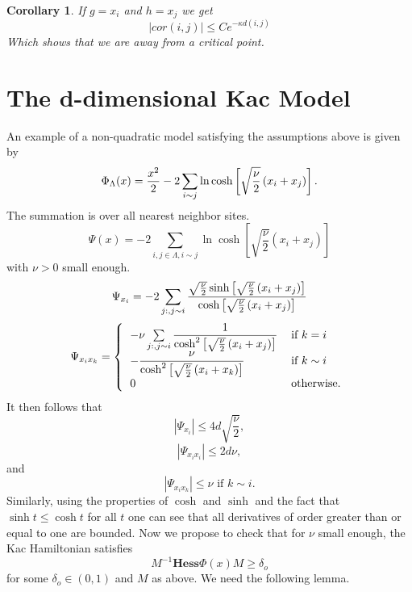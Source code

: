 \documentclass{article}
\newtheorem{corollary}[theorem]{Corollary}
\begin{document}
\begin{corollary}
If $g=x_{i}$ and $h=x_{j}$ we get 
\begin{equation*}
\left| cor(i,j)\right| \leq Ce^{-\kappa d(i,j)}
\end{equation*}%
Which shows that we are away from a critical point.
\end{corollary}

\section{The d-dimensional Kac Model}

An example of a non-quadratic model satisfying the assumptions above is
given by 
\begin{equation*}
\Phi _{\Lambda }(x)=\frac{x^{2}}{2}-2\sum_{i\sim j}\ln \cosh \left[ \sqrt{%
\frac{\nu }{2}}\left( x_{i}+x_{j}\right) \right] .
\end{equation*}%
The summation is over all nearest neighbor sites.%
\begin{equation*}
\Psi (x)=-2\sum_{i,j\in \Lambda ,i\sim j}\ln \cosh \left[ \sqrt{\frac{\nu }{2%
}}\left( x_{i}+x_{j}\right) \right]
\end{equation*}%
with $\nu >0$ small enough.%
\begin{equation*}
\Psi _{x_{i}}=-2\sum_{j:,j\sim i}\frac{\sqrt{\frac{\nu }{2}}\sinh \left[ 
\sqrt{\frac{\nu }{2}}\left( x_{i}+x_{j}\right) \right] }{\cosh \left[ \sqrt{%
\frac{\nu }{2}}\left( x_{i}+x_{j}\right) \right] }
\end{equation*}%
\begin{equation*}
\Psi _{x_{i}x_{k}}=\left\{ 
\begin{tabular}{ll}
$-\nu \sum\limits_{j:,j\sim i}\dfrac{1}{\cosh ^{2}\left[ \sqrt{\frac{\nu }{2}%
}\left( x_{i}+x_{j}\right) \right] }$ & if $k=i$ \\ 
$-\dfrac{\nu }{\cosh ^{2}\left[ \sqrt{\frac{\nu }{2}}\left(
x_{i}+x_{k}\right) \right] }$ & if $k\sim i$ \\ 
$0$ & otherwise.%
\end{tabular}%
\right.
\end{equation*}%
It then follows that%
\begin{equation*}
\left| \Psi _{x_{i}}\right| \leq 4d\sqrt{\frac{\nu }{2}},
\end{equation*}%
\begin{equation*}
\left| \Psi _{x_{i}x_{i}}\right| \leq 2d\nu ,
\end{equation*}%
and 
\begin{equation*}
\left| \Psi _{x_{i}x_{k}}\right| \leq \nu \text{ \ \ \ \ if }k\sim i.
\end{equation*}%
Similarly, using the properties of $\cosh $ and $\sinh $ and the fact that $%
\sinh t\leq \cosh t$ for all $t$ one can see that all derivatives of order
greater than or equal to one are bounded. Now we propose to check that for $%
\nu $ small enough, the Kac Hamiltonian satisfies 
\begin{equation*}
M^{-1}\mathbf{Hess}\Phi (x)M\geq \delta _{o}
\end{equation*}%
for some $\delta _{o}\in (0,1)$ and $M$ as above.\newline
We need the following lemma.
\end{document}
